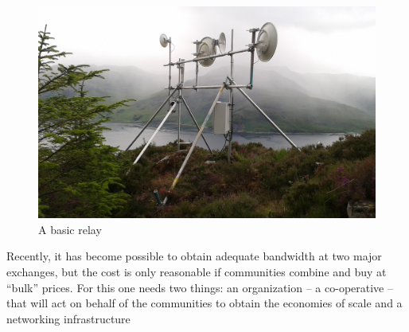 \begin{figure}[h]
\centering
 \includegraphics[width=\columnwidth]{figs/mhialairigh-from-behind}
 \caption{A basic relay}
\label{fig:mhialairigh}
\end{figure}

Recently, it has become possible to obtain adequate bandwidth at two major exchanges, but the cost is only reasonable if communities combine and buy at ``bulk'' prices.  For this one needs two things: an organization -- a co-operative -- that will act on behalf of the communities to obtain the economies of scale and a networking infrastructure

